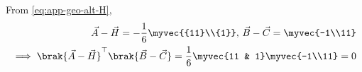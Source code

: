 \solution
From 
		\eqref{eq:app-geo-alt-H},
\begin{align}
\vec{A}-\vec{H}=-\frac{1}{6}\myvec{{11}\\{1}},\,
\vec{B}-\vec{C}=\myvec{-1\\11}
\\
	\implies \brak{\vec{A}-\vec{H}}^{\top}\brak{\vec{B}-\vec{C}}=\frac{1}{6}\myvec{11 & 1}
\myvec{-1\\11}
=0
\end{align}

